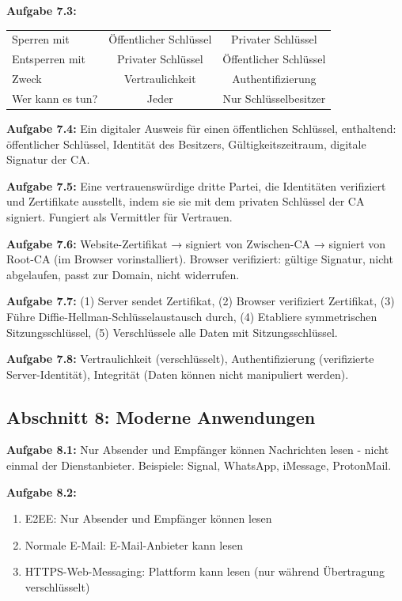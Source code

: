 \documentclass[11pt,a4paper]{report}
\begin{document}
\textbf{Aufgabe 7.3:}
\begin{center}
\begin{tabular}{|l|c|c|}
\hline
Sperren mit & Öffentlicher Schlüssel & Privater Schlüssel \\
Entsperren mit & Privater Schlüssel & Öffentlicher Schlüssel \\
Zweck & Vertraulichkeit & Authentifizierung \\
Wer kann es tun? & Jeder & Nur Schlüsselbesitzer \\
\hline
\end{tabular}
\end{center}

\textbf{Aufgabe 7.4:}
Ein digitaler Ausweis für einen öffentlichen Schlüssel, enthaltend: öffentlicher Schlüssel, Identität des Besitzers, Gültigkeitszeitraum, digitale Signatur der CA.

\textbf{Aufgabe 7.5:}
Eine vertrauenswürdige dritte Partei, die Identitäten verifiziert und Zertifikate ausstellt, indem sie sie mit dem privaten Schlüssel der CA signiert. Fungiert als Vermittler für Vertrauen.

\textbf{Aufgabe 7.6:}
Website-Zertifikat → signiert von Zwischen-CA → signiert von Root-CA (im Browser vorinstalliert). Browser verifiziert: gültige Signatur, nicht abgelaufen, passt zur Domain, nicht widerrufen.

\textbf{Aufgabe 7.7:}
(1) Server sendet Zertifikat, (2) Browser verifiziert Zertifikat, (3) Führe Diffie-Hellman-Schlüsselaustausch durch, (4) Etabliere symmetrischen Sitzungsschlüssel, (5) Verschlüssele alle Daten mit Sitzungsschlüssel.

\textbf{Aufgabe 7.8:}
Vertraulichkeit (verschlüsselt), Authentifizierung (verifizierte Server-Identität), Integrität (Daten können nicht manipuliert werden).

\subsection*{Abschnitt 8: Moderne Anwendungen}

\textbf{Aufgabe 8.1:}
Nur Absender und Empfänger können Nachrichten lesen - nicht einmal der Dienstanbieter. Beispiele: Signal, WhatsApp, iMessage, ProtonMail.

\textbf{Aufgabe 8.2:}
\begin{enumerate}[label=\alph*)]
    \item E2EE: Nur Absender und Empfänger können lesen
    \item Normale E-Mail: E-Mail-Anbieter kann lesen
    \item HTTPS-Web-Messaging: Plattform kann lesen (nur während Übertragung verschlüsselt)
\end{enumerate}
\end{document}
